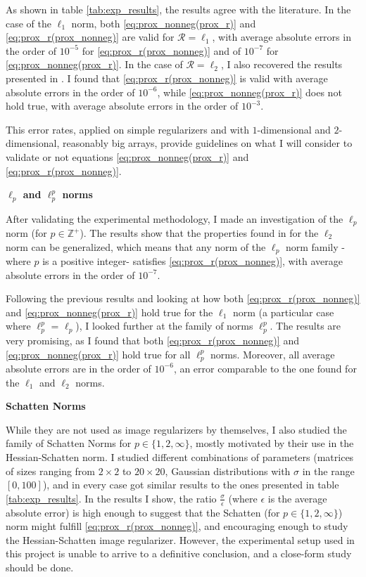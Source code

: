 As shown in table \ref{tab:exp_results}, the results agree with the literature. In the case of the $\ell_1$ norm, both \eqref{eq:prox_nonneg(prox_r)} and \eqref{eq:prox_r(prox_nonneg)} are valid for $\mathcal{R} = \ell_1$, with average absolute errors in the order of $10^{-5}$ for  \eqref{eq:prox_r(prox_nonneg)} and of $10^{-7}$ for  \eqref{eq:prox_nonneg(prox_r)}. In the case of $\mathcal{R} = \ell_2$, I also recovered the results presented in \cite{del_aguila_pla_cell_2018}. I found that  \eqref{eq:prox_r(prox_nonneg)} is valid with average absolute errors in the order of $10^{-6}$, while  \eqref{eq:prox_nonneg(prox_r)} does not hold true, with average absolute errors in the order of $10^{-3}$. 

This error rates, applied on simple regularizers and with $1$-dimensional and $2$-dimensional, reasonably big arrays, provide guidelines on what I will consider to validate or not equations \eqref{eq:prox_nonneg(prox_r)} and \eqref{eq:prox_r(prox_nonneg)}.

\noindent\textbf{$\ell_p$ and $\ell_p^p$ norms} 

After validating the experimental methodology, I made an investigation of the $\ell_p$ norm (for $p \in \mathbb{Z}^+$). The results show that the properties found in \cite{del_aguila_pla_cell_2018, del_aguila_pla_cell_2018-1} for the $\ell_2$ norm can be generalized, which means that any norm of the $\ell_p$ norm family - where $p$ is a positive integer- satisfies  \eqref{eq:prox_r(prox_nonneg)}, with average absolute errors in the order of $10^{-7}$. 

Following the previous results and looking at how both  \eqref{eq:prox_r(prox_nonneg)} and  \eqref{eq:prox_nonneg(prox_r)} hold true for the $\ell_1$ norm (a particular case where $\ell_p^p$ = $\ell_p$), I looked further at the family of norms $\ell_p^p$. The results are very promising, as I found that both \eqref{eq:prox_r(prox_nonneg)} and  \eqref{eq:prox_nonneg(prox_r)} hold true for all $\ell_p^p$ norms. Moreover, all average absolute errors are in the order of $10^{-6}$, an error comparable to the one found for the $\ell_1$ and $\ell_2$ norms. 

\noindent\textbf{Schatten Norms}

While they are not used as image regularizers by themselves, I also studied the family of Schatten Norms for $p \in \{1, 2, \infty\}$, mostly motivated by their use in the Hessian-Schatten norm. I studied different combinations of parameters (matrices of sizes ranging from $2\times 2$ to $20\times 20$, Gaussian distributions with $\sigma$ in the range $[0, 100]$), and in every case got similar results to the ones presented in table \ref{tab:exp_results}. In the results I show, the ratio $\frac{\sigma}{\epsilon}$ (where $\epsilon$ is the average absolute error) is high enough to suggest that the Schatten (for $p \in \{1, 2, \infty\}$) norm might fulfill  \eqref{eq:prox_r(prox_nonneg)}, and encouraging enough to study the Hessian-Schatten image regularizer. However, the experimental setup used in this project is unable to arrive to a definitive conclusion, and a close-form study should be done.  

